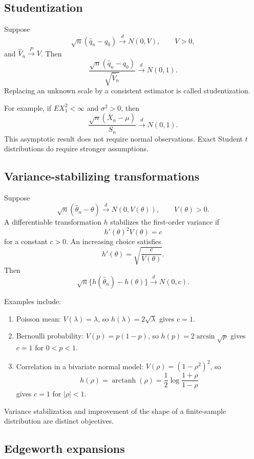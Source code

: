 \subsection{Studentization}

Suppose
\[
\sqrt n(\widehat q_n-q_0)\xrightarrow{d}N(0,V),
\qquad V>0,
\]
and $\widehat V_n\xrightarrow{P}V$. Then
\[
\frac{\sqrt n(\widehat q_n-q_0)}{\sqrt{\widehat V_n}}
\xrightarrow{d}N(0,1).
\]
Replacing an unknown scale by a consistent estimator is called
studentization.

For example, if $EX_1^2<\infty$ and $\sigma^2>0$, then
\[
\frac{\sqrt n(\overline X_n-\mu)}{S_n}
\xrightarrow{d}N(0,1).
\]
This asymptotic result does not require normal observations.
Exact Student $t$ distributions do require stronger assumptions.

\subsection{Variance-stabilizing transformations}

Suppose
\[
\sqrt n(\widehat\theta_n-\theta)
\xrightarrow{d}N(0,V(\theta)),
\qquad V(\theta)>0.
\]
A differentiable transformation $h$ stabilizes the first-order
variance if
\[
h'(\theta)^2V(\theta)=c
\]
for a constant $c>0$. An increasing choice satisfies
\[
h'(\theta)=\sqrt{\frac{c}{V(\theta)}}.
\]
Then
\[
\sqrt n\{h(\widehat\theta_n)-h(\theta)\}
\xrightarrow{d}N(0,c).
\]

Examples include:
\begin{enumerate}
\item Poisson mean:
$V(\lambda)=\lambda$, so $h(\lambda)=2\sqrt\lambda$ gives $c=1$.

\item Bernoulli probability:
$V(p)=p(1-p)$, so $h(p)=2\arcsin\sqrt p$ gives $c=1$ for $0<p<1$.

\item Correlation in a bivariate normal model:
$V(\rho)=(1-\rho^2)^2$, so
\[
h(\rho)=\operatorname{arctanh}(\rho)
=\frac12\log\frac{1+\rho}{1-\rho}
\]
gives $c=1$ for $|\rho|<1$.
\end{enumerate}
Variance stabilization and improvement of the shape of a
finite-sample distribution are distinct objectives.

\subsection{Edgeworth expansions}

